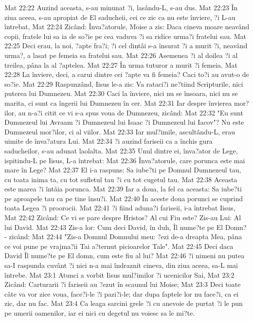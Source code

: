 Mat 22:22  Auzind aceasta, s-au minunat ?i, lasându-L, s-au dus.
Mat 22:23  În ziua aceea, s-au apropiat de El saducheii, cei ce zic ca nu este înviere, ?i L-au întrebat,
Mat 22:24  Zicând: Înva?atorule, Moise a zis: Daca cineva moare neavând copii, fratele lui sa ia de so?ie pe cea vaduva ?i sa ridice urma?i fratelui sau.
Mat 22:25  Deci erau, la noi, ?apte fra?i; ?i cel dintâi s-a însurat ?i a murit ?i, neavând urma?, a lasat pe femeia sa fratelui sau.
Mat 22:26  Asemenea ?i al doilea ?i al treilea, pâna la al ?aptelea.
Mat 22:27  În urma tuturor a murit ?i femeia.
Mat 22:28  La înviere, deci, a carui dintre cei ?apte va fi femeia? Caci to?i au avut-o de so?ie.
Mat 22:29  Raspunzând, Iisus le-a zis: Va rataci?i ne?tiind Scripturile, nici puterea lui Dumnezeu.
Mat 22:30  Caci la înviere, nici nu se însoara, nici nu se marita, ci sunt ca îngerii lui Dumnezeu în cer.
Mat 22:31  Iar despre învierea mor?ilor, au n-a?i citit ce vi s-a spus voua de Dumnezeu, zicând:
Mat 22:32  "Eu sunt Dumnezeul lui Avraam ?i Dumnezeul lui Isaac ?i Dumnezeul lui Iacov"? Nu este Dumnezeul mor?ilor, ci al viilor.
Mat 22:33  Iar mul?imile, ascultându-L, erau uimite de înva?atura Lui.
Mat 22:34  ?i auzind fariseii ca a închis gura saducheilor, s-au adunat laolalta.
Mat 22:35  Unul dintre ei, înva?ator de Lege, ispitindu-L pe Iisus, L-a întrebat:
Mat 22:36  Înva?atorule, care porunca este mai mare în Lege?
Mat 22:37  El i-a raspuns: Sa iube?ti pe Domnul Dumnezeul tau, cu toata inima ta, cu tot sufletul tau ?i cu tot cugetul tau.
Mat 22:38  Aceasta este marea ?i întâia porunca.
Mat 22:39  Iar a doua, la fel ca aceasta: Sa iube?ti pe aproapele tau ca pe tine însu?i.
Mat 22:40  În aceste doua porunci se cuprind toata Legea ?i proorocii.
Mat 22:41  ?i fiind aduna?i fariseii, i-a întrebat Iisus,
Mat 22:42  Zicând: Ce vi se pare despre Hristos? Al cui Fiu este? Zis-au Lui: Al lui David.
Mat 22:43  Zis-a lor: Cum deci David, în duh, Îl nume?te pe El Domn? - zicând:
Mat 22:44  "Zis-a Domnul Domnului meu: ?ezi de-a dreapta Mea, pâna ce voi pune pe vrajma?ii Tai a?ternut picioarelor Tale".
Mat 22:45  Deci daca David Îl nume?te pe El domn, cum este fiu al lui?
Mat 22:46  ?i nimeni nu putea sa-I raspunda cuvânt ?i nici n-a mai îndraznit cineva, din ziua aceea, sa-L mai întrebe.
Mat 23:1  Atunci a vorbit Iisus mul?imilor ?i ucenicilor Sai,
Mat 23:2  Zicând: Carturarii ?i fariseii au ?ezut în scaunul lui Moise;
Mat 23:3  Deci toate câte va vor zice voua, face?i-le ?i pazi?i-le; dar dupa faptele lor nu face?i, ca ei zic, dar nu fac.
Mat 23:4  Ca leaga sarcini grele ?i cu anevoie de purtat ?i le pun pe umerii oamenilor, iar ei nici cu degetul nu voiesc sa le mi?te.
